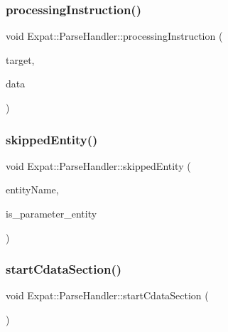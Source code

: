 \hypertarget{class_expat_1_1_parse_handler_a7ede3019b6e3eba355504bc34f0143d9}{}\label{class_expat_1_1_parse_handler_a7ede3019b6e3eba355504bc34f0143d9} 
\subsubsection{\texorpdfstring{processing\+Instruction()}{processingInstruction()}}
{\footnotesize\ttfamily void Expat\+::\+Parse\+Handler\+::processing\+Instruction (\begin{DoxyParamCaption}\item[{const X\+M\+L\+\_\+\+Char $\ast$}]{target,  }\item[{const X\+M\+L\+\_\+\+Char $\ast$}]{data }\end{DoxyParamCaption})\hspace{0.3cm}{\ttfamily [virtual]}}

\hypertarget{class_expat_1_1_parse_handler_a53aeb5ae280522c3c54a7f78fe660cb0}{}\label{class_expat_1_1_parse_handler_a53aeb5ae280522c3c54a7f78fe660cb0} 
\subsubsection{\texorpdfstring{skipped\+Entity()}{skippedEntity()}}
{\footnotesize\ttfamily void Expat\+::\+Parse\+Handler\+::skipped\+Entity (\begin{DoxyParamCaption}\item[{const X\+M\+L\+\_\+\+Char $\ast$}]{entity\+Name,  }\item[{int}]{is\+\_\+parameter\+\_\+entity }\end{DoxyParamCaption})\hspace{0.3cm}{\ttfamily [virtual]}}

\hypertarget{class_expat_1_1_parse_handler_aa839f673fa3b34090b3a6d4341da7df8}{}\label{class_expat_1_1_parse_handler_aa839f673fa3b34090b3a6d4341da7df8} 
\subsubsection{\texorpdfstring{start\+Cdata\+Section()}{startCdataSection()}}
{\footnotesize\ttfamily void Expat\+::\+Parse\+Handler\+::start\+Cdata\+Section (\begin{DoxyParamCaption}{ }\end{DoxyParamCaption})\hspace{0.3cm}{\ttfamily [virtual]}}

